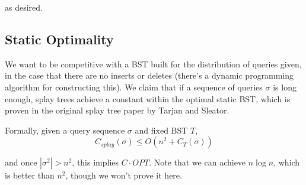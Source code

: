 \documentclass[11pt]{article}
\begin{document}
as desired.

\subsection{Static Optimality}
We want to be competitive with a BST built for the distribution of queries given, in the case that there are no inserts or deletes (there's a dynamic programming algorithm for constructing this). We claim that if a sequence of queries $\sigma$ is long enough, splay trees achieve a constant within the optimal static BST, which is proven in the original splay tree paper by Tarjan and Sleator\cite{SJ85-SPLAY}.

Formally, given a query sequence $\sigma$ and fixed BST $T$, 
\[C_{splay}(\sigma) \le O(n^2 + C_T(\sigma))\]

and once $|\sigma^2| > n^2$, this implies $C\cdot OPT$. Note that we can achieve $n\log n$, which is better than $n^2$, though we won't prove it here.
\end{document}
